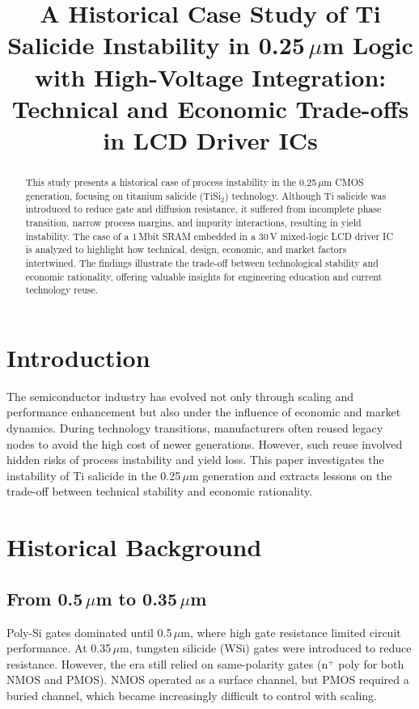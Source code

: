 \documentclass[conference]{IEEEtran}
\title{A Historical Case Study of Ti Salicide Instability in 0.25\,$\mu$m Logic with High-Voltage Integration: \\ 
Technical and Economic Trade-offs in LCD Driver ICs}
\author{
  \IEEEauthorblockN{[Author Name]}
  \IEEEauthorblockA{
    [Affiliation] \\
    [Email]
  }
}
\begin{document}
\maketitle

\begin{abstract}
This study presents a historical case of process instability in the 0.25\,$\mu$m CMOS generation, focusing on titanium salicide (TiSi$_2$) technology. Although Ti salicide was introduced to reduce gate and diffusion resistance, it suffered from incomplete phase transition, narrow process margins, and impurity interactions, resulting in yield instability. The case of a 1\,Mbit SRAM embedded in a 30\,V mixed-logic LCD driver IC is analyzed to highlight how technical, design, economic, and market factors intertwined. The findings illustrate the trade-off between technological stability and economic rationality, offering valuable insights for engineering education and current technology reuse.
\end{abstract}

\section{Introduction}
The semiconductor industry has evolved not only through scaling and performance enhancement but also under the influence of economic and market dynamics. During technology transitions, manufacturers often reused legacy nodes to avoid the high cost of newer generations. However, such reuse involved hidden risks of process instability and yield loss.  
This paper investigates the instability of Ti salicide in the 0.25\,$\mu$m generation and extracts lessons on the trade-off between technical stability and economic rationality.

\section{Historical Background}
\subsection{From 0.5\,$\mu$m to 0.35\,$\mu$m}
Poly-Si gates dominated until 0.5\,$\mu$m, where high gate resistance limited circuit performance.  
At 0.35\,$\mu$m, tungsten silicide (WSi) gates were introduced to reduce resistance. However, the era still relied on same-polarity gates (n$^+$ poly for both NMOS and PMOS). NMOS operated as a surface channel, but PMOS required a buried channel, which became increasingly difficult to control with scaling.
\end{document}
